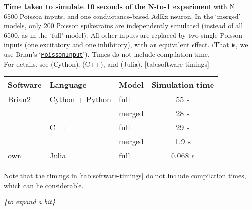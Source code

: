 \begin{table}[h]
    \begin{sidecaption}
        {\textbf{Time taken to simulate 10 seconds of the N-to-1 experiment}
        {\small with N = 6500 Poisson inputs, and one conductance-based AdEx neuron. In the `merged' models, only 200 Poisson spiketrains are independently simulated (instead of all 6500, as in the `full' model). All other inputs are replaced by two single Poisson inputs (one excitatory and one inhibitory), with an equivalent effect. (That is, we use Brian's `\texttt{\href{https://brian2.readthedocs.io/en/stable/user/input.html\#efficient-poisson-inputs-via-poissoninput}{PoissonInput}}').
        Times do not include compilation time.\\
        For details, see  (Cython),  (C++), and  (Julia).}
        }
        [tab:software-timings]
            \begin{tabular}{l l l S[table-format=2.3]}  %
            Software & Language & Model  &  {Simulation time} \\
            \hline
            Brian2 &  Cython + Python   & full  &  55 { s}  \\
            &   & merged  &  28 { s}  \\
            &  C++   & full  &  29 { s}  \\
            &   & merged  &  1.9 { s}  \\
            own &  Julia   & full  & 0.068 { s}  \\
        \end{tabular}
    \end{sidecaption}
\end{table}

Note that the timings in \cref{tab:software-timings} do not include compilation times, which can be considerable.

\emph{\{to expand a bit\}}
